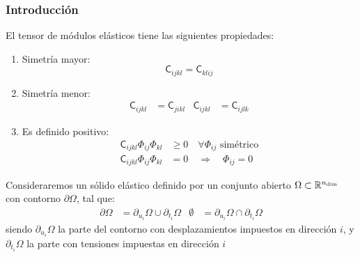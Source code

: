 \documentclass{beamer}
\begin{document}
\begin{frame}
\frametitle{Introducción}
El tensor de módulos elásticos tiene las siguientes propiedades:
\begin{enumerate}
\item Simetría mayor:
\begin{equation}
\mathsf{C}_{ijkl}=\mathsf{C}_{klij} \label{scmayor}
\end{equation}
\item Simetría menor:
\begin{align}
\mathsf{C}_{ijkl}&=\mathsf{C}_{jikl} &
\mathsf{C}_{ijkl}&=\mathsf{C}_{ijlk}
\end{align}
\item Es definido positivo:
\begin{align}
\mathsf{C}_{ijkl} \Phi_{ij} \Phi_{kl}& \geq 0 \quad \forall \Phi_{ij}
\textrm{ simétrico} \label{sfcdpos1}\\
\mathsf{C}_{ijkl} \Phi_{ij} \Phi_{kl} &=0 \quad \Rightarrow \quad
\Phi_{ij}=0 \label{sfcdpos2}
\end{align}
\end{enumerate}
Consideraremos un sólido elástico definido por un conjunto abierto
$\Omega \subset \mathbb{R}^{n_{\rm dim}}$ con contorno
$\partial \Omega$, tal que:
\begin{align}
\partial \Omega &=\partial_{u_i} \Omega \cup \partial_{t_i} \Omega &
\emptyset       &=\partial_{u_i} \Omega \cap \partial_{t_i} \Omega
\end{align}
siendo $\partial_{u_i} \Omega$ la parte del contorno con desplazamientos
impuestos en dirección $i$, y $\partial_{t_i} \Omega$ la parte con tensiones
impuestas en dirección $i$
\end{frame}
\end{document}
